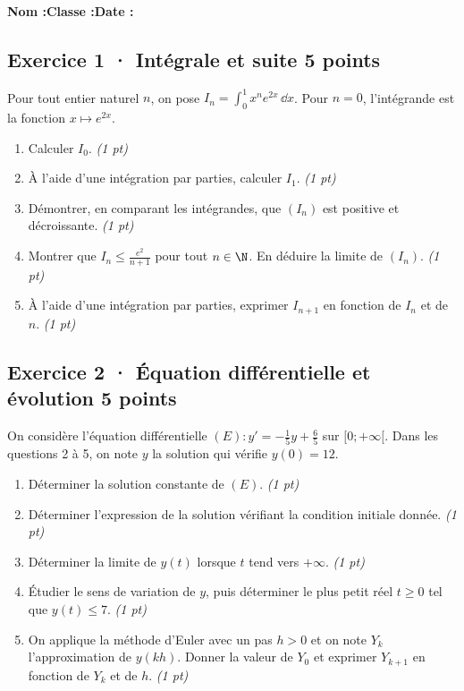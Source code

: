 \smallskip\textbf{Nom :}\enspace\dotfill\quad\textbf{Classe :}\enspace\dotfill\quad\textbf{Date :}\enspace\dotfill

\subsection*{Exercice 1 · Intégrale et suite \hfill 5 points}Pour tout entier naturel $n$, on pose $I_n=\displaystyle\int_0^1x^ne^{2x}\,\dd x$. Pour $n=0$, l'intégrande est la fonction $x\mapsto e^{2x}$.

\begin{enumerate}

\item Calculer $I_0$. \hfill\textit{(1 pt)}

\item À l'aide d'une intégration par parties, calculer $I_1$. \hfill\textit{(1 pt)}

\item Démontrer, en comparant les intégrandes, que $(I_n)$ est positive et décroissante. \hfill\textit{(1 pt)}

\item Montrer que $I_n\le\frac{e^{2}}{n+1}$ pour tout $n\in\N$. En déduire la limite de $(I_n)$. \hfill\textit{(1 pt)}

\item À l'aide d'une intégration par parties, exprimer $I_{n+1}$ en fonction de $I_n$ et de $n$. \hfill\textit{(1 pt)}

\end{enumerate}

\subsection*{Exercice 2 · Équation différentielle et évolution \hfill 5 points}On considère l'équation différentielle $(E):y'=-\frac1{5}y+\frac{6}{5}$ sur $[0;+\infty[$. Dans les questions 2 à 5, on note $y$ la solution qui vérifie $y(0)=12$.

\begin{enumerate}

\item Déterminer la solution constante de $(E)$. \hfill\textit{(1 pt)}

\item Déterminer l'expression de la solution vérifiant la condition initiale donnée. \hfill\textit{(1 pt)}

\item Déterminer la limite de $y(t)$ lorsque $t$ tend vers $+\infty$. \hfill\textit{(1 pt)}

\item Étudier le sens de variation de $y$, puis déterminer le plus petit réel $t\ge0$ tel que $y(t)\le7$. \hfill\textit{(1 pt)}

\item On applique la méthode d'Euler avec un pas $h>0$ et on note $Y_k$ l'approximation de $y(kh)$. Donner la valeur de $Y_0$ et exprimer $Y_{k+1}$ en fonction de $Y_k$ et de $h$. \hfill\textit{(1 pt)}

\end{enumerate}

